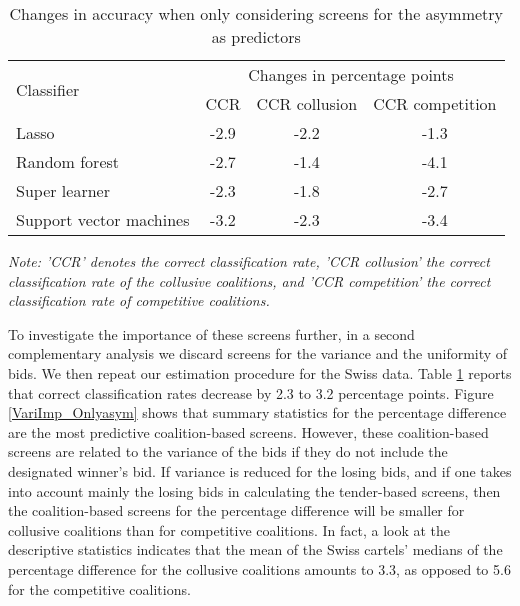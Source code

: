 \documentclass[a4paper,11pt]{article}
\begin{document}
	\begin{table}[ht]
		\caption{Changes in accuracy when only considering screens for the asymmetry as predictors}\label{CCRonlyasym}
		\begin{center}
			\begin{tabular}{lccc}
				\hline
				\multirow{2}{*}{Classifier} & \multicolumn{3}{c}{Changes in percentage points}               \\ \cline{2-4} 
				& CCR  & CCR collusion  & CCR competition \\ \hline
				Lasso                       & -2.9    & -2.2              & -1.3                \\
				Random   forest             & -2.7    & -1.4              & -4.1                \\
				Super learner               & -2.3    & -1.8              & -2.7               \\
				Support   vector machines   & -3.2    & -2.3              & -3.4               \\ \hline
			\end{tabular}
		\end{center}
		\par
		\textit{Note: 'CCR' denotes the correct classification rate, 'CCR collusion' the correct classification rate of the collusive coalitions, and 'CCR competition' the correct classification rate of competitive coalitions.}
	\end{table}
	
	To investigate the importance of these screens further, in a second complementary analysis we discard screens for the variance and the uniformity of bids. We then repeat our estimation procedure for the Swiss data. Table \ref{CCRonlyasym} reports that correct classification rates decrease by 2.3 to 3.2 percentage points. Figure \ref{VariImp_Onlyasym} shows that summary statistics for the percentage difference are the most predictive coalition-based screens. However, these coalition-based screens are related to the variance of the bids if they do not include the designated winner’s bid. If variance is reduced for the losing bids, and if one takes into account mainly the losing bids in calculating the tender-based screens, then the coalition-based screens for the percentage difference will be smaller for collusive coalitions than for competitive coalitions. In fact, a look at the descriptive statistics indicates that the mean of the Swiss cartels' medians of the percentage difference for the collusive coalitions amounts to 3.3, as opposed to 5.6 for the competitive coalitions.
	
\end{document}
